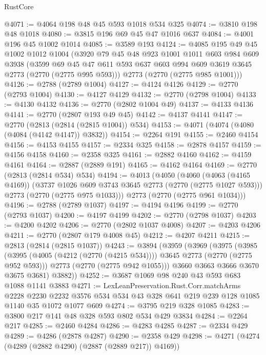 \begin{lexlean}{RustCore}
\begin{coremodule}
@4071 := @4064 @198 @48 @45 @593 @1018 @534 @325
@4074 := @3810 @198 @48 @1018
@4080 := @3815 @196 @69 @45 @47 @1016 @637
@4084 := @4001 @196 @45 @1002 @1014
@4085 := @3589 @193
@4124 := @4085
    @195
    @49
    @45
    @1002
    @1012
    @1004
    (@3920
      @79
      @45
      @48
      @923
      @1001
      @1011
      @603
      @984
      @609
      @3938
      (@3599 @69 @45 @47 @611 @593 @637 @603 @994 @609 @3619 @3645 @2773 (@2770 (@2775 @995 @593)))
      @2773
      (@2770 (@2775 @985 @1001)))
@4126 := @2788 (@2789 @1004)
@4127 := @4124 @4126
@4129 := @2770 (@2793 @1004)
@4130 := @4127 @4129
@4132 := @2770 (@2798 @1004)
@4133 := @4130 @4132
@4136 := @2770 (@2802 @1004 @49)
@4137 := @4133 @4136
@4141 := @2770 (@2807 @193 @49 @45)
@4142 := @4137 @4141
@4147 := @2770 (@2813 (@2814 (@2815 @1004)) @534)
@4153 := @4071 (@4074 (@4080 (@4084 (@4142 @4147)) @3832))
@4154 := @2264 @191
@4155 := @2460 @4154
@4156 := @4153 @4155
@4157 := @2334 @325
@4158 := @2878 @4157
@4159 := @4156 @4158
@4160 := @2358 @325
@4161 := @2882 @4160
@4162 := @4159 @4161
@4164 := @2887 (@2889 @191)
@4165 := @4162 @4164
@4169 := @2770 (@2813 (@2814 @534) @534)
@4194 := @4013
    (@4050
      (@4060
        (@4063 (@4165 @4169))
        (@3737 @1026 @609 @3743 @3645 @2773 (@2770 (@2775 @1027 @593)))
        @2773
        (@2770 (@2775 @975 @1033)))
      @2773
      (@2770 (@2775 @961 @1034)))
@4196 := @2788 (@2789 @1037)
@4197 := @4194 @4196
@4199 := @2770 (@2793 @1037)
@4200 := @4197 @4199
@4202 := @2770 (@2798 @1037)
@4203 := @4200 @4202
@4206 := @2770 (@2802 @1037 @4008)
@4207 := @4203 @4206
@4211 := @2770 (@2807 @179 @4008 @45)
@4212 := @4207 @4211
@4215 := @2813 (@2814 (@2815 @1037))
@4243 := @3894
    (@3959
      (@3969
        (@3975
          (@3985
            (@3995 (@4005 (@4212 (@2770 (@4215 @534)))) @3645 @2773 (@2770 (@2775 @952 @593)))
            @2773
            (@2770 (@2775 @942 @1055)))
          @3660
          @3663
          @3666
          @3670
          @3675
          @3681)
        @3882))
@4252 := @3687 @1069 @98 @240 @43 @593 @683 @1088 @1141 @3883
@4271 := LexLeanPreservation.Rust.Corr.matchArms
    @2228
    @2230
    @2232
    @3576
    @534
    @534
    @43
    @328
    @641
    @219
    @239
    @128
    @1085
    @1140
    @35
    @1072
    @1077
    @609
@4274 := @3795 @219 @328 @1085
@4283 := @3800 @217 @141 @48 @328 @593 @802 @534 @429 @3834
@4284 := @2264 @217
@4285 := @2460 @4284
@4286 := @4283 @4285
@4287 := @2334 @429
@4289 := @4286 (@2878 @4287)
@4290 := @2358 @429
@4298 := @4271 (@4274 (@4289 (@2882 @4290) (@2887 (@2889 @217)) @4169))

\end{coremodule}
\end{lexlean}
